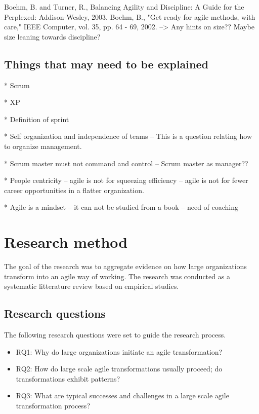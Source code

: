 \documentclass[preprint,authoryear,12pt]{elsarticle}
\begin{document}
Boehm, B. and Turner, R., Balancing Agility and Discipline: A Guide for the
Perplexed: Addison-Wesley, 2003.
Boehm, B., "Get ready for agile methods, with care," IEEE Computer, vol. 35,
pp. 64 - 69, 2002.
--> Any hints on size?? Maybe size leaning towards discipline?

\subsection{Things that may need to be explained}

* Scrum

* XP

* Definition of sprint

* Self organization and independence of teams -- This is a question relating how
  to organize management. 

* Scrum master must not command and control -- Scrum master as manager??

* People centricity -- agile is not for squeezing efficiency -- agile is not for
  fewer career opportunities in a flatter organization.

* Agile is a mindset -- it can not be studied from a book -- need of coaching

\section{Research method}
\label{sec:method}

The goal of the research was to aggregate evidence on how large organizations
transform into an agile way of working. The research was conducted as a
systematic litterature review based on empirical studies.

\subsection{Research questions}

The following research questions were set to guide the research process.

\begin{itemize}

\item
RQ1: Why do large organizations initiate an agile transformation?

\item
RQ2: How do large scale agile transformations usually proceed; do
     transformations exhibit patterns?

\item
RQ3: What are typical successes and challenges in a large scale agile
     transformation process?

\end{itemize}
\end{document}
